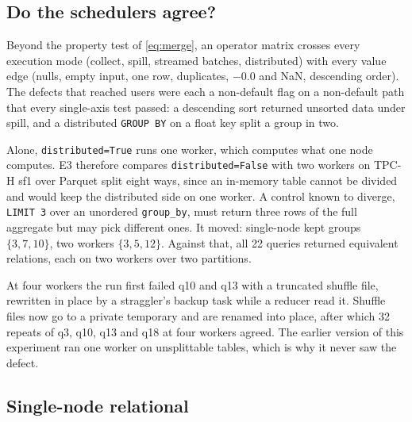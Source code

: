 \documentclass[10pt,twocolumn,letterpaper]{article}   %
\newcommand{\E}[1]{\textsf{E#1}}
\begin{document}
\subsection{Do the schedulers agree?}
\label{sec:eval-algebra}

Beyond the property test of \cref{eq:merge}, an operator matrix crosses every execution mode
(collect, spill, streamed batches, distributed) with every value edge (nulls, empty input, one
row, duplicates, $-0.0$ and NaN, descending order). The defects that reached users were each a
non-default flag on a non-default path that every single-axis test passed: a descending sort
returned unsorted data under spill, and a distributed \texttt{GROUP BY} on a float key split a
group in two.

Alone, \texttt{distributed=True} runs one worker, which computes what one node computes. \E{3}
therefore compares \texttt{distributed=False} with two workers on TPC-H sf1 over Parquet split
eight ways, since an in-memory table cannot be divided and would keep the distributed side on
one worker. A control known to diverge, \texttt{LIMIT 3} over an unordered \texttt{group\_by},
must return three rows of the full aggregate but may pick different ones. It moved: single-node
kept groups $\{3,7,10\}$, two workers $\{3,5,12\}$. Against that, all 22 queries returned
equivalent relations, each on two workers over two partitions.

At four workers the run first failed q10 and q13 with a truncated shuffle file, rewritten in
place by a straggler's backup task while a reducer read it. Shuffle files now go to a private
temporary and are renamed into place, after which 32 repeats of q3, q10, q13 and q18 at four
workers agreed. The earlier version of this experiment ran one worker on unsplittable tables,
which is why it never saw the defect.

\subsection{Single-node relational}
\label{sec:eval-tpch}
\end{document}
